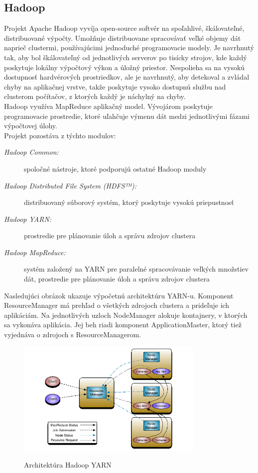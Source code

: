 \documentclass[printed,11pt,twoside,color,cover,table]{fithesis3}
\begin{document}
\subsection{Hadoop}
Projekt Apache Hadoop vyvíja open-source softvér na spoľahlivé, škálovateľné, distribuované výpočty. Umožňuje distribuovane spracovávať veľké objemy dát
naprieč clustermi, používajúcimi jednoduché programovacie modely. Je navrhnutý tak, aby bol škálovateľný od jednotlivých serverov po tisícky strojov, kde každý poskytuje lokálny výpočtový výkon a úložný 
priestor. Nespolieha sa na vysokú dostupnosť hardvérových prostriedkov, ale je navrhnutý, aby detekoval a zvládal chyby na aplikačnej vrstve, takže poskytuje vysoko dostupnú službu nad clusterom počítačov, 
z ktorých každý je náchylný na chyby. \cite{hadoop}
\\Hadoop využíva MapReduce aplikačný model. Vývojárom poskytuje programovacie prostredie, ktoré uľahčuje výmenu dát medzi jednotlivými fázami výpočtovej úlohy. 
\\Projekt pozostáva z týchto modulov:
\begin{description}
\item[\emph{Hadoop Common:}] spoločné nástroje, ktoré podporujú ostatné Hadoop moduly
\item[\emph{Hadoop Distributed File System (HDFS™):}] distribuovaný súborový systém, ktorý poskytuje vysokú priepustnosť
\item[\emph{Hadoop YARN:}] prostredie pre plánovanie úloh a správu zdrojov clustera
\item[\emph{Hadoop MapReduce:}] systém založený na YARN pre paralelné spracovávanie veľkých množstiev dát, prostredie pre plánovanie úloh a správu zdrojov clustera
\end{description}

Nasledujúci obrázok ukazuje výpočetnú architektúru YARN-u. Komponent ResourceManager má prehľad o všetkých zdrojoch clustera a prideľuje ich aplikáciám. Na jednotlivých uzloch NodeManager alokuje 
kontajnery, v ktorých sa vykonáva aplikácia. Jej beh riadi komponent ApplicationMaster, ktorý tiež vyjednáva o zdrojoch s ResourceManagerom.
\begin{figure}
\begin{center}
       \includegraphics[width=0.8\textwidth]{images/yarn_architecture.png}
       \caption{Architektúra Hadoop YARN}\cite{pbs_pro_arch}
\end{center}
\end{figure}
\end{document}
